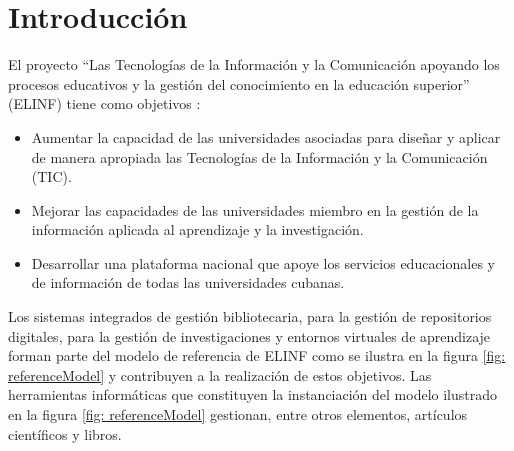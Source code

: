 %
\chapter*{\large Introducción}

\pagestyle{fancy}
\renewcommand{\sectionmark}[1]{\markright{#1}}

\lhead{}
\chead{}
\lfoot{}
\cfoot{}
\rfoot{\thepage}
\renewcommand{\headrulewidth}{0.4pt}

 \def\bibname{\large Introducción}

\pagestyle{fancy}
\lhead{}
\chead{}
\lfoot{}
\cfoot{}
\rfoot{\thepage}
\renewcommand{\headrulewidth}{0.4pt}
\vspace{-1cm}

El proyecto ``Las Tecnologías de la Información y la Comunicación apoyando los procesos educativos y la gestión del conocimiento en la educación superior'' (ELINF) tiene como objetivos \citep{Ciudad-Ricardo2017}:

\begin{itemize}
\item Aumentar la capacidad de las universidades asociadas para diseñar y aplicar de manera apropiada las Tecnologías de la Información y la Comunicación (TIC).
\item Mejorar las capacidades de las universidades miembro en la gestión de la información aplicada al aprendizaje y la investigación.
\item Desarrollar una plataforma nacional que apoye los servicios educacionales y de información de todas las universidades cubanas.
\end{itemize}

Los sistemas integrados de gestión bibliotecaria, para la gestión de repositorios digitales, para la gestión de investigaciones y entornos virtuales de aprendizaje forman parte del modelo de referencia de ELINF como se ilustra en la figura \ref{fig: referenceModel} y contribuyen a la realización de estos objetivos. Las herramientas informáticas que constituyen la instanciación del modelo ilustrado en la figura \ref{fig: referenceModel} gestionan, entre otros elementos, artículos científicos y libros.

